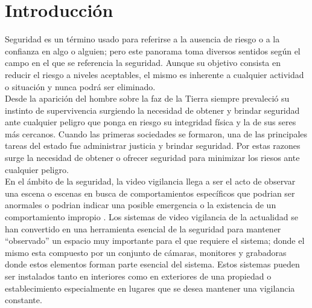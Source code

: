 \chapter{Introducción}

Seguridad es un término usado para referirse a la ausencia de riesgo o a la confianza en algo o alguien; pero este panorama toma diversos sentidos según el campo en el que se referencia la seguridad. Aunque su objetivo consista en reducir el riesgo a niveles aceptables, el mismo es inherente a cualquier actividad o situación y nunca podrá ser eliminado.\\

Desde la aparición del hombre sobre la faz de la Tierra siempre prevaleció su instinto de supervivencia surgiendo la necesidad de obtener y brindar seguridad ante cualquier peligro que ponga en riesgo su integridad física y la de sus seres más cercanos. Cuando las primeras sociedades se formaron, una de las principales tareas del estado fue administrar justicia y brindar seguridad. Por estas razones surge la necesidad de obtener o ofrecer seguridad para minimizar los riesos ante cualquier peligro.\\

En el ámbito de la seguridad, la video vigilancia llega a ser el acto de observar una escena o escenas en busca de comportamientos específicos que podrian ser anormales o podrian indicar una posible emergencia o la existencia de un comportamiento impropio \cite{NORMAN:201795}. Los sistemas de video vigilancia de la actualidad se han convertido en una herramienta esencial de la seguridad para mantener ``observado'' un espacio muy importante para el que requiere el sistema; donde el mismo esta compuesto por un conjunto de cámaras, monitores y grabadoras donde estos elementos forman parte esencial del sistema. Estos sistemas pueden ser instalados tanto en interiores como en exteriores de una propiedad o establecimiento especialmente en lugares que se desea mantener una vigilancia constante.\\

